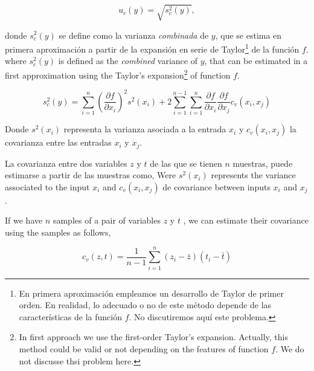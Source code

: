 \begin{equation*}
u_c(y) =\sqrt{s_c^2(y)},
\end{equation*}

\begin{paracol}{2}
donde  $s_c^2(y)$ se define como la  varianza \emph{combinada} de $y$, que se estima en primera aproximación a partir de la expansión en serie de Taylor\footnote{En primera aproximación empleamos un desarrollo de Taylor de primer orden. En realidad, lo adecuado o no de este método depende de las características de la función $f$. No discutiremos aquí este problema.} de la función $f$.	
\switchcolumn
where $s_c^2(y)$ is defined as the \emph{combined} variance of $y$, that can be estimated in a first approximation using the Taylor's expansion\footnote{In first approach we use the first-order Taylor's expansion. Actually, this method could be valid or not depending on the features of function $f$. We do not discusse thsi problem here.} of function $f$.    
\end{paracol}
\begin{equation*}
s_c^2(y) = \sum_{i=1}^n\left(\frac{\partial f}{\partial x_i}\right)^2 s^2(x_i) + 2\sum_{i=1}^{n-1}\sum_{i=1}^n \frac{\partial f}{\partial x_i}\frac{\partial f}{\partial x_j} c_v(x_i,x_j)
\end{equation*}

\begin{paracol}{2}
Donde $s^2(x_i)$  representa la varianza asociada a la entrada $x_i$ y $c_v(x_i, x_j)$ la covarianza entre las entradas $x_i$ y $x_j$. 

La covarianza entre dos variables $z$ y $t$ de las que se tienen $n$ muestras, puede estimarse a partir de las muestras como,
\switchcolumn
Were $s^2(x_i)$ represents the variance associated to the input $x_i$ and $c_v(x_i,x_j)$ de covariance between inputs $x_i$ and $x_j$.

If we have $n$ samples of a pair of variables $z$ y $t$ , we can estimate their covariance using the samples as follows, 
\end{paracol}
\begin{equation*}
c_v(z,t) =\frac{1}{n-1}\sum_{i=1}^n(z_i-\bar{z})(t_i-\bar{t})
\end{equation*}

